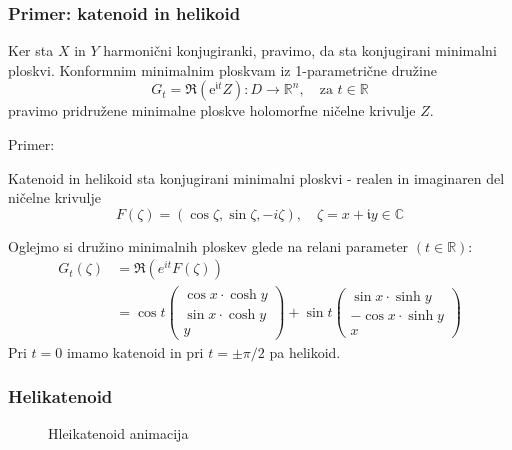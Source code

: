 \documentclass[8pt]{beamer}
\theoremstyle{definition}
\theoremstyle{remark}
\theoremstyle{plain}
\numberwithin{equation}{section}  %
\begin{document}
\begin{frame}
    \frametitle{Primer: katenoid in helikoid}

    Ker sta $X$ in $Y$ harmonični konjugiranki, pravimo, da sta \textcolor{red1}{konjugirani minimalni ploskvi}. Konformnim minimalnim ploskvam iz 1-parametrične družine 
    \begin{equation*}
        G_t=\Re\left(\mathrm{e}^{\mathfrak{i} t} Z\right): D \longrightarrow \mathbb{R}^n, \quad \text{za }t \in \mathbb{R}
    \end{equation*}
    pravimo \textcolor{red1}{pridružene minimalne ploskve} holomorfne ničelne krivulje $Z$.
    
    \vspace{0.8em}

    \textcolor{red1}{Primer:}

    Katenoid in helikoid sta konjugirani minimalni ploskvi - realen in imaginaren del ničelne krivulje 
    \begin{equation*}
        F(\zeta)=(\cos \zeta, \sin \zeta,-i \zeta), \quad \zeta=x+\mathfrak{i} y \in \mathbb{C}        
    \end{equation*}

    

    Oglejmo si družino minimalnih ploskev glede na relani parameter $(t \in \mathbb{R})$:
    \begin{align*}
        G_t(\zeta) & =\Re\left(e^{i t} F(\zeta)\right) \\
        & =\cos t\begin{pmatrix}
        \cos x \cdot \cosh y \\
        \sin x \cdot \cosh y \\
        y
        \end{pmatrix}+\sin t\begin{pmatrix}
        \sin x \cdot \sinh y \\
        -\cos x \cdot \sinh y \\
        x
        \end{pmatrix}
    \end{align*}
    Pri $t=0$ imamo katenoid in pri $t= \pm \pi / 2$ pa helikoid. 

\end{frame}

\begin{frame}
    \frametitle{Helikatenoid}

    \begin{figure}[ht]
        \centering
        \caption{Hleikatenoid animacija}
    \end{figure}
\end{frame}
\end{document}

